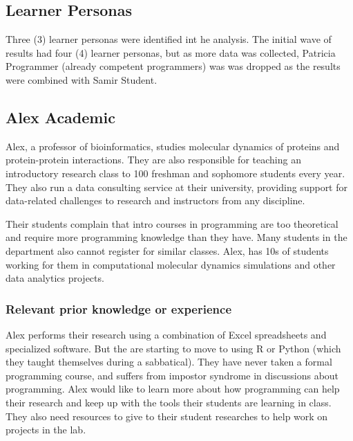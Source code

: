 \documentclass[020-persona\_validation.tex]{subfiles}
\begin{document}
\subsection{Learner Personas}
\label{sse:learner-personas}

    Three (3) learner personas were identified int he analysis.
    The initial wave of results had four (4) learner personas,
    but as more data was collected, Patricia Programmer
    (already competent programmers)
    was was dropped as the results were combined with Samir Student.

    \subsection{Alex Academic}

        Alex, a professor of bioinformatics,
        studies molecular dynamics of proteins and protein-protein interactions.
        They are also responsible for teaching an introductory research class to 100 freshman and sophomore students every year.
        They also run a data consulting service at their university,
        providing support for data-related challenges to research and instructors from any discipline.

        Their students complain that intro courses in programming are too theoretical and
        require more programming knowledge than they have.
        Many students in the department also cannot register for similar classes.
        Alex, has 10s of students working for them in computational molecular dynamics simulations and other data analytics projects.

        \subsubsection{Relevant prior knowledge or experience}

            Alex performs their research using a combination of
            Excel spreadsheets and specialized software.
            But the are starting to move to using R or Python (which they taught themselves during a sabbatical).
            They have never taken a formal programming course,
            and suffers from impostor syndrome in discussions about programming.
            Alex would like to learn more about how programming can help their research and
            keep up with the tools their students are learning in class.
            They also need resources to give to their student researches to help work on projects in the lab.
\end{document}

